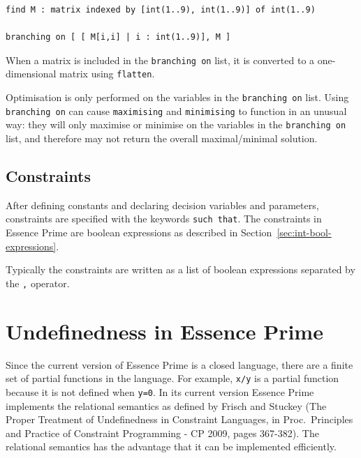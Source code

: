 \documentclass[a4paper]{article}
\newcommand{\eprime}{{\sc Essence Prime}\xspace}
\begin{document}
\begin{verbatim}
find M : matrix indexed by [int(1..9), int(1..9)] of int(1..9)

branching on [ [ M[i,i] | i : int(1..9)], M ]
\end{verbatim}

When a matrix is included in the \texttt{branching on} list, it is converted to
a one-dimensional matrix using \texttt{flatten}. 

Optimisation is only performed on the variables in the \texttt{branching on} list. 
Using {\tt branching on} can cause {\tt maximising} and {\tt minimising} to 
function in an unusual way: they will only maximise or minimise on the variables in 
the {\tt branching on} list, and therefore may not return the overall maximal/minimal 
solution. 




%

\subsection{Constraints}

After defining constants and declaring decision variables and parameters,
constraints are specified with the keywords {\tt such that}. The constraints in
\eprime are boolean expressions as described in Section~\ref{sec:int-bool-expressions}.

Typically the constraints are written as a list of boolean expressions separated
by the \texttt{,} operator.  


\section{Undefinedness in \eprime}\label{sec:undef}

Since the current version of \eprime is a closed language, there are a finite set
of partial functions in the language. For example, \texttt{x/y} is a partial function
because it is not defined when \texttt{y=0}. In its current version \eprime implements the 
relational semantics as defined by Frisch and Stuckey 
(The Proper Treatment of Undefinedness in Constraint Languages, in Proc.\ Principles and Practice of Constraint Programming - CP 2009, pages 367-382).
The relational semantics has the advantage that it can be implemented efficiently. 
\end{document}
